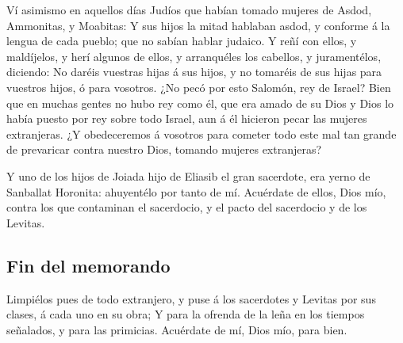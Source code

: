  Ví asimismo en aquellos días Judíos que habían tomado
mujeres de Asdod, Ammonitas, y Moabitas:  Y sus hijos la
mitad hablaban asdod, y conforme á la lengua de cada pueblo; que no
sabían hablar judaico.  Y reñí con ellos, y maldíjelos, y
herí algunos de ellos, y arranquéles los cabellos, y juramentélos,
diciendo: No daréis vuestras hijas á sus hijos, y no tomaréis de sus
hijas para vuestros hijos, ó para vosotros.  ¿No pecó por
esto Salomón, rey de Israel? Bien que en muchas gentes no hubo rey como
él, que era amado de su Dios y Dios lo había puesto por rey sobre todo
Israel, aun á él hicieron pecar las mujeres extranjeras. 
¿Y obedeceremos á vosotros para cometer todo este mal tan grande de
prevaricar contra nuestro Dios, tomando mujeres extranjeras?

 Y uno de los hijos de Joiada hijo de Eliasib el gran
sacerdote, era yerno de Sanballat Horonita: ahuyentélo por tanto de mí.
 Acuérdate de ellos, Dios mío, contra los que contaminan
el sacerdocio, y el pacto del sacerdocio y de los Levitas.

\hypertarget{fin-del-memorando}{%
\subsection{Fin del memorando}\label{fin-del-memorando}}

 Limpiélos pues de todo extranjero, y puse á los
sacerdotes y Levitas por sus clases, á cada uno en su obra;
 Y para la ofrenda de la leña en los tiempos señalados, y
para las primicias. Acuérdate de mí, Dios mío, para bien.
